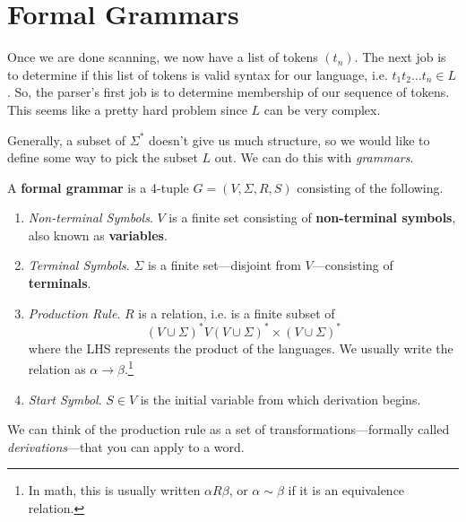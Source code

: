 \section{Formal Grammars} 

  Once we are done scanning, we now have a list of tokens $(t_n)$. The next job is to determine if this list of tokens is valid syntax for our language, i.e. $t_1 t_2 \ldots t_n \in L$. So, the parser's first job is to determine membership of our sequence of tokens. This seems like a pretty hard problem since $L$ can be very complex. 

  Generally, a subset of $\Sigma^\ast$ doesn't give us much structure, so we would like to define some way to pick the subset $L$ out. We can do this with \textit{grammars}. 

  \begin{definition}
    A \textbf{formal grammar} is a 4-tuple $G = (V, \Sigma, R, S)$ consisting of the following. 
    \begin{enumerate}
      \item \textit{Non-terminal Symbols}. $V$ is a finite set consisting of \textbf{non-terminal symbols}, also known as \textbf{variables}. 
      \item \textit{Terminal Symbols}. $\Sigma$ is a finite set---disjoint from $V$---consisting of \textbf{terminals}. 
      \item \textit{Production Rule}. $R$ is a relation, i.e. is a finite subset of 
        \begin{equation}
          (V \cup \Sigma)^\ast V (V \cup \Sigma)^\ast \times (V \cup \Sigma)^\ast
        \end{equation}
        where the LHS represents the product of the languages. We usually write the relation as $\alpha \to \beta$.\footnote{In math, this is usually written $\alpha R \beta$, or $\alpha \sim \beta$ if it is an equivalence relation.}

      \item \textit{Start Symbol}. $S \in V$ is the initial variable from which derivation begins. 
    \end{enumerate}
  \end{definition}

  We can think of the production rule as a set of transformations---formally called \textit{derivations}---that you can apply to a word. 

